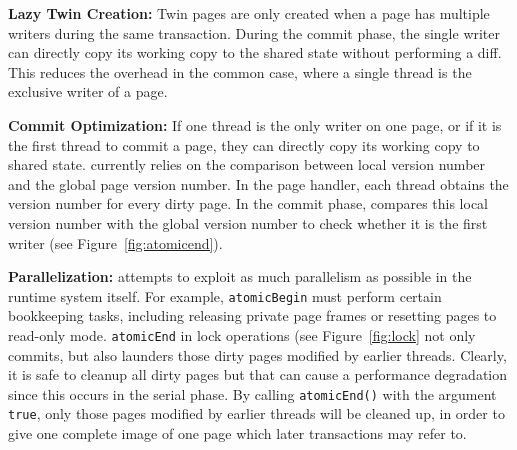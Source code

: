 \textbf{Lazy Twin Creation: }
Twin pages are only created when a page has multiple writers during the same transaction.  
During the commit phase, the single writer can directly copy its working copy to the shared state 
without performing a diff. This reduces the overhead in the common case, 
where a single thread is the exclusive writer of a page.

\textbf{Commit Optimization: }
If one thread is the only writer on one page, or if it is the first thread to commit a page,
they can directly copy its working copy to shared state.
\dthreads{} currently relies on the comparison between local version number and the global page version number. 
In the page handler, each thread obtains the version number for every dirty page. 
In the commit phase, \dthreads{} compares this local version number with the global version
number to check whether it is the first writer (see Figure~\ref{fig:atomicend}).

\textbf{Parallelization: }
\dthreads{} attempts to exploit as much parallelism as possible in the runtime system itself.
For example, \texttt{atomicBegin} must perform certain bookkeeping
tasks, including releasing private page frames or resetting pages to
read-only mode.  \texttt{atomicEnd} in lock operations (see
Figure~\ref{fig:lock} not only commits, but also launders those dirty
pages modified by earlier threads.  Clearly, it is safe to cleanup all
dirty pages but that can cause a performance degradation since this
occurs in the serial phase.  By calling \texttt{atomicEnd()} with the
argument \texttt{true}, only those pages modified by earlier threads
will be cleaned up, in order to give one complete image of one page
which later transactions may refer to.
